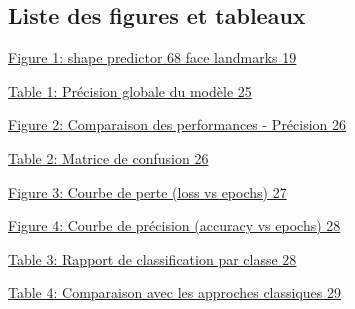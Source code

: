 \documentclass[
]{article}
\begin{document}
\hypertarget{liste-des-figures-et-tableaux}{%
\subsection{Liste des figures et tableaux}\label{liste-des-figures-et-tableaux}}

\protect\hyperlink{figure-1-shape-predictor-68-face-landmarks}{Figure 1: shape predictor 68 face landmarks 19}

\protect\hyperlink{table-1-pruxe9cision-globale-du-moduxe8le}{Table 1: Précision globale du modèle 25}

\protect\hyperlink{figure-2-comparaison-des-performances---pruxe9cision}{Figure 2: Comparaison des performances - Précision 26}

\protect\hyperlink{table-2-matrice-de-confusion}{Table 2: Matrice de confusion 26}

\protect\hyperlink{figure-3-courbe-de-perte-loss-vs-epochs}{Figure 3: Courbe de perte (loss vs epochs) 27}

\protect\hyperlink{figure-4-courbe-de-pruxe9cision-accuracy-vs-epochs}{Figure 4: Courbe de précision (accuracy vs epochs) 28}

\protect\hyperlink{table-3-rapport-de-classification-par-classe}{Table 3: Rapport de classification par classe 28}

\protect\hyperlink{table-4-comparaison-avec-les-approches-classiques}{Table 4: Comparaison avec les approches classiques 29}

\hypertarget{section-20}{%
\subsection{}\label{section-20}}

\hypertarget{section-21}{%
\subsection{}\label{section-21}}

\hypertarget{section-22}{%
\subsection{}\label{section-22}}

\hypertarget{section-23}{%
\subsection{}\label{section-23}}

\hypertarget{section-24}{%
\subsection{}\label{section-24}}
\end{document}
